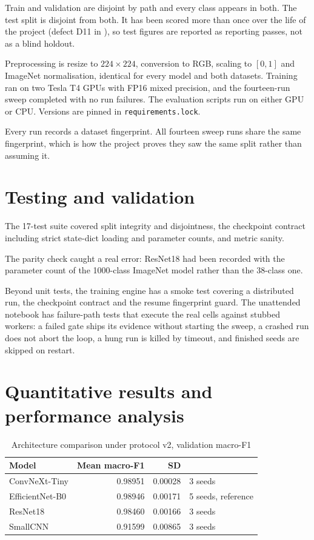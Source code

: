 Train and validation are disjoint by path and every class appears in both. The test
split is disjoint from both. It has been scored more than once over the life of the
project (defect D11 in ), so test figures are reported
as reporting passes, not as a blind holdout.

Preprocessing is resize to $224\times224$, conversion to RGB, scaling to $[0,1]$ and
ImageNet normalisation, identical for every model and both datasets. Training ran on
two Tesla T4 GPUs with FP16 mixed precision, and the fourteen-run sweep completed with
no run failures. The evaluation scripts run on either GPU or CPU. Versions are pinned
in \texttt{requirements.lock}.

Every run records a dataset fingerprint. All fourteen sweep runs share the same
fingerprint, which is how the project proves they saw the same split rather than
assuming it.

\section{Testing and validation}

The 17-test suite covered split integrity and disjointness, the checkpoint contract
including strict state-dict loading and parameter counts, and metric sanity.

The parity check caught a real error: ResNet18 had been recorded with the parameter
count of the 1000-class ImageNet model rather than the 38-class one.

Beyond unit tests, the training engine has a smoke test covering a distributed run,
the checkpoint contract and the resume fingerprint guard. The unattended notebook has
failure-path tests that execute the real cells against stubbed workers: a failed gate
ships its evidence without starting the sweep, a crashed run does not abort the loop,
a hung run is killed by timeout, and finished seeds are skipped on restart.

\section{Quantitative results and performance analysis}

\begin{table}[H]
\centering
\caption{Architecture comparison under protocol v2, validation macro-F1}
\label{tab:results-mid}
\tabfont
\begin{tabularx}{\textwidth}{@{}lrrY@{}}
\toprule
\textbf{Model} & \textbf{Mean macro-F1} & \textbf{SD} & \\
\midrule
ConvNeXt-Tiny & 0.98951 & 0.00028 & 3 seeds \\
EfficientNet-B0 & 0.98946 & 0.00171 & 5 seeds, reference \\
ResNet18 & 0.98460 & 0.00166 & 3 seeds \\
SmallCNN & 0.91599 & 0.00865 & 3 seeds \\
\bottomrule
\end{tabularx}
\end{table}

